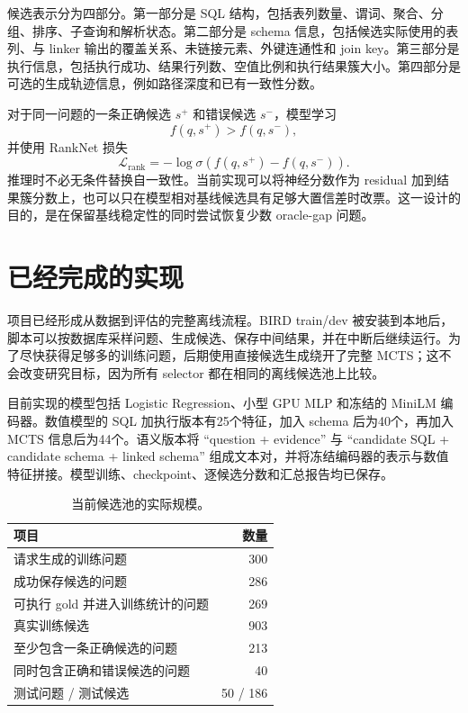 \documentclass[UTF8,11pt,fontset=windows]{ctexart}
\begin{document}
候选表示分为四部分。第一部分是 SQL 结构，包括表列数量、谓词、聚合、分组、排序、子查询和解析状态。第二部分是 schema 信息，包括候选实际使用的表列、与 linker 输出的覆盖关系、未链接元素、外键连通性和 join key。第三部分是执行信息，包括执行成功、结果行列数、空值比例和执行结果簇大小。第四部分是可选的生成轨迹信息，例如路径深度和已有一致性分数。

对于同一问题的一条正确候选 $s^+$ 和错误候选 $s^-$，模型学习
\[
f(q,s^+) > f(q,s^-),
\]
并使用 RankNet 损失
\[
\mathcal{L}_{\mathrm{rank}}
=-\log \sigma\!\left(f(q,s^+)-f(q,s^-)\right).
\]
推理时不必无条件替换自一致性。当前实现可以将神经分数作为 residual 加到结果簇分数上，也可以只在模型相对基线候选具有足够大置信差时改票。这一设计的目的，是在保留基线稳定性的同时尝试恢复少数 oracle-gap 问题。

\section{已经完成的实现}

项目已经形成从数据到评估的完整离线流程。BIRD train/dev 被安装到本地后，脚本可以按数据库采样问题、生成候选、保存中间结果，并在中断后继续运行。为了尽快获得足够多的训练问题，后期使用直接候选生成绕开了完整 MCTS；这不会改变研究目标，因为所有 selector 都在相同的离线候选池上比较。

目前实现的模型包括 Logistic Regression、小型 GPU MLP 和冻结的 MiniLM 编码器。数值模型的 SQL 加执行版本有25个特征，加入 schema 后为40个，再加入 MCTS 信息后为44个。语义版本将 ``question + evidence'' 与 ``candidate SQL + candidate schema + linked schema'' 组成文本对，并将冻结编码器的表示与数值特征拼接。模型训练、checkpoint、逐候选分数和汇总报告均已保存。

\begin{table}[ht]
\centering
\caption{当前候选池的实际规模。}
\begin{tabular}{lr}
\toprule
项目 & 数量\\
\midrule
请求生成的训练问题 & 300\\
成功保存候选的问题 & 286\\
可执行 gold 并进入训练统计的问题 & 269\\
真实训练候选 & 903\\
至少包含一条正确候选的问题 & 213\\
同时包含正确和错误候选的问题 & 40\\
测试问题 / 测试候选 & 50 / 186\\
\bottomrule
\end{tabular}
\end{table}
\end{document}
